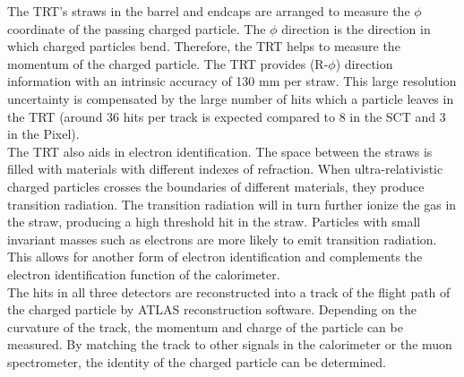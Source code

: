 \indent The TRT's straws in the barrel and endcaps are arranged to measure the $\phi$ coordinate of the passing charged particle. The $\phi$ direction is the direction in which charged particles bend. Therefore, the TRT helps to measure the momentum of the charged particle. The TRT provides (R-$\phi$) direction information with an intrinsic accuracy of 130 mm per straw. This large resolution uncertainty is compensated by the large number of hits which a particle leaves in the TRT (around 36 hits per track is expected compared to 8 in the SCT and 3 in the Pixel). ~\\
\indent The TRT also aids in electron identification. The space between the straws is filled with materials with different indexes of refraction. When ultra-relativistic charged particles crosses the boundaries of different materials, they produce transition radiation. The transition radiation will in turn further ionize the gas in the straw, producing a high threshold hit in the straw. Particles with small invariant masses such as electrons are more likely to emit transition radiation. This allows for another form of electron identification and complements the electron identification function of the calorimeter. ~\\
\indent The hits in all three detectors are reconstructed into a track of the flight path of the charged particle by ATLAS reconstruction software. Depending on the curvature of the track, the momentum and charge of the particle can be measured. By matching the track to other signals in the calorimeter or the muon spectrometer, the identity of the charged particle can be determined. ~\\
